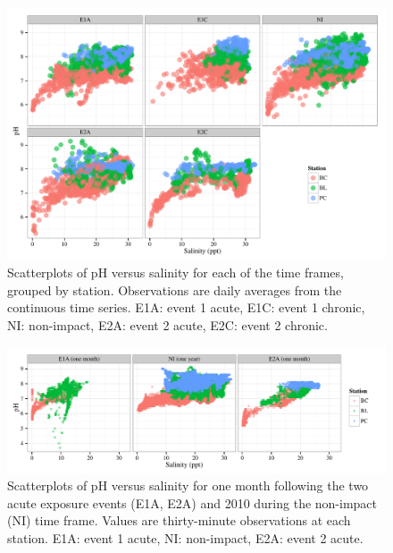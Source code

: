 \documentclass[letterpaper,12pt]{article}\usepackage[]{graphicx}\usepackage[]{color}
\makeatletter
\def\maxwidth{ %
  \ifdim\Gin@nat@width>\linewidth
    \linewidth
  \else
    \Gin@nat@width
  \fi
}
\makeatother
\begin{document}
\begin{figure}[!ht]

{\centering \includegraphics[width=\maxwidth]{figs/phvsal1-1} 

}

\caption[Scatterplots of pH versus salinity for each of the time frames, grouped by station]{Scatterplots of pH versus salinity for each of the time frames, grouped by station.  Observations are daily averages from the continuous time series. E1A: event 1 acute, E1C: event 1 chronic, NI: non-impact, E2A: event 2 acute, E2C: event 2 chronic.}\label{fig:phvsal1}
\end{figure}


\clearpage

\begin{figure}[!ht]

{\centering \includegraphics[width=\maxwidth]{figs/phvsal2-1} 

}

\caption[Scatterplots of pH versus salinity for one month following the two acute exposure events (E1A, E2A) and 2010 during the non-impact (NI) time frame]{Scatterplots of pH versus salinity for one month following the two acute exposure events (E1A, E2A) and 2010 during the non-impact (NI) time frame.  Values are thirty-minute observations at each station. E1A: event 1 acute, NI: non-impact, E2A: event 2 acute.}\label{fig:phvsal2}
\end{figure}
\end{document}
